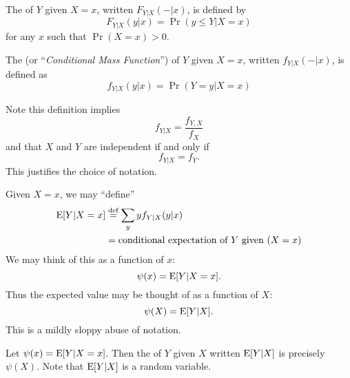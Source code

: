 \begin{defn}
The  of $Y$ given $X=x$,
written $F_{Y|X}(-|x)$, is defined by
\begin{equation}
F_{Y|X}(y|x) = \Pr(y\leq Y|X=x)
\end{equation}
for any $x$ such that $\Pr(X=x)>0$.

The  (or ``\emph{Conditional
Mass Function\/}'') of $Y$ given $X=x$, written $f_{Y|X}(-|x)$, is
defined as
\begin{equation}
f_{Y|X}(y|x)=\Pr(Y=y|X=x)
\end{equation}
\end{defn}
\begin{rmk}
Note this definition implies
\begin{equation}
f_{Y|X}=\frac{f_{Y,X}}{f_{X}}
\end{equation}
and that $X$ and $Y$ are independent if and only if
\begin{equation}
f_{Y|X}=f_{Y}.
\end{equation}
This justifies the choice of notation.
\end{rmk}
\begin{rmk}
Given $X=x$, we may ``define''
\begin{equation}\label{eq:defn:rmk:condExpect}
\begin{split}
\mathrm{E}[Y|X=x] &\stackrel{\text{def}}{=} \sum_{y}yf_{Y|X}(y|x)\\
&=\mbox{conditional expectation of $Y$ given $(X=x)$}
\end{split}
\end{equation}
We may think of this as a function of $x$:
\begin{equation}
\psi(x) = \mathrm{E}[Y|X=x].
\end{equation}
Thus the expected value may be thought of as a function of $X$:
\begin{equation}
\psi(X) = \mathrm{E}[Y|X].
\end{equation}
This is a mildly sloppy abuse of notation.
\end{rmk}
\begin{defn}
Let $\psi(x)=\mathrm{E}[Y|X=x]$. Then the  of $Y$ given $X$ written $\mathrm{E}[Y|X]$ is precisely
$\psi(X)$. Note that $\mathrm{E}[Y|X]$ is a random variable. 
\end{defn}

